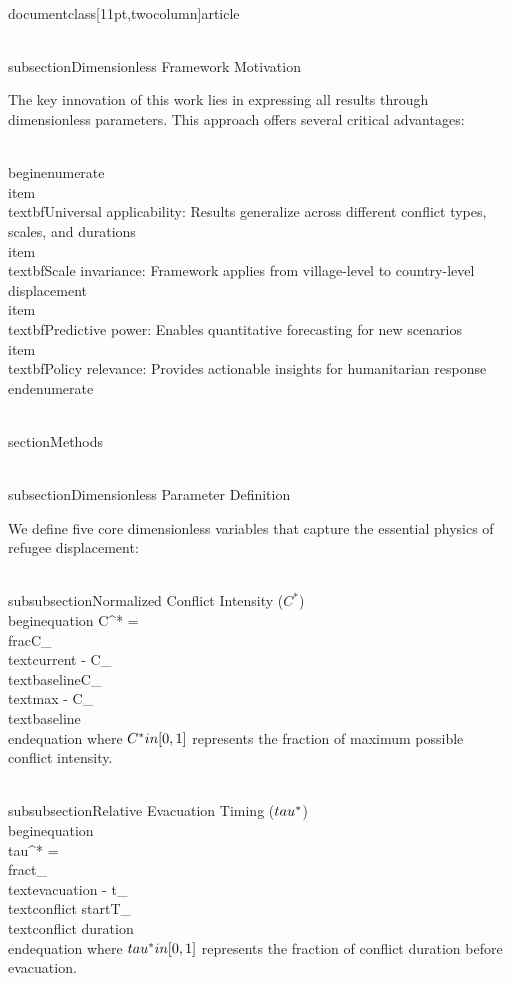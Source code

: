 \\documentclass[11pt,twocolumn]{article}
\begin{document}
\\subsection{Dimensionless Framework Motivation}

The key innovation of this work lies in expressing all results through dimensionless parameters. This approach offers several critical advantages:

\\begin{enumerate}
    \\item \\textbf{Universal applicability}: Results generalize across different conflict types, scales, and durations
    \\item \\textbf{Scale invariance}: Framework applies from village-level to country-level displacement
    \\item \\textbf{Predictive power}: Enables quantitative forecasting for new scenarios
    \\item \\textbf{Policy relevance}: Provides actionable insights for humanitarian response
\\end{enumerate}

\\section{Methods}

\\subsection{Dimensionless Parameter Definition}

We define five core dimensionless variables that capture the essential physics of refugee displacement:

\\subsubsection{Normalized Conflict Intensity ($C^*$)}
\\begin{equation}
C^* = \\frac{C_{\\text{current}} - C_{\\text{baseline}}}{C_{\\text{max}} - C_{\\text{baseline}}}
\\end{equation}
where $C^* \\in [0,1]$ represents the fraction of maximum possible conflict intensity.

\\subsubsection{Relative Evacuation Timing ($\\tau^*$)}
\\begin{equation}
\\tau^* = \\frac{t_{\\text{evacuation}} - t_{\\text{conflict start}}}{T_{\\text{conflict duration}}}
\\end{equation}
where $\\tau^* \\in [0,1]$ represents the fraction of conflict duration before evacuation.
\end{document}
